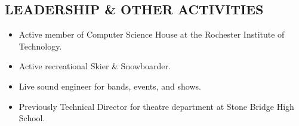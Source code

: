 \documentclass[line]{res}
\begin{document}
\begin{resume}
\section{LEADERSHIP \& OTHER ACTIVITIES}
  \begin{itemize}[leftmargin=10pt]
  \item Active member of Computer Science House at the Rochester Institute of Technology.
    \item Active recreational Skier \& Snowboarder.
    \item Live sound engineer for bands, events, and shows.
    \item Previously Technical Director for theatre department at Stone Bridge High School.
  \end{itemize}

\end{resume}
\end{document}
